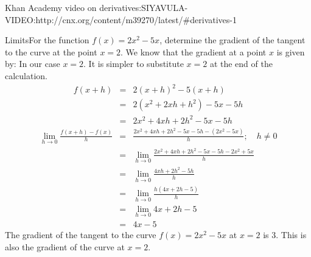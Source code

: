 Khan Academy video on derivatives:SIYAVULA-VIDEO:http://cnx.org/content/m39270/latest/#derivatives-1

\begin{wex}{Limits}{For the function $f(x)=2x^2-5x$, determine the 
gradient of the tangent to the curve 
at the point $x=2$.}{
We know that the gradient at a point $x$ is given by:
In our case $x=2$. It is simpler to substitute $x=2$ at the end of the calculation.
\begin{eqnarray*}
f(x+h)&=&2(x+h)^2-5(x+h)\\
&=&2(x^2+2xh+h^2)-5x-5h\\
&=&2x^2+4xh+2h^2-5x-5h
\end{eqnarray*}
\begin{eqnarray*}
\lim_{h \to 0}\frac{f(x+h)-f(x)}{h}&=&\frac{2x^2+4xh+2h^2-5x-5h - (2x^2-5x)}{h};\quad h\neq0\\
&=&\lim_{h \to 0}\frac{2x^2+4xh+2h^2-5x-5h - 2x^2+5x}{h}\\
&=&\lim_{h \to 0}\frac{4xh+2h^2-5h}{h}\\
&=&\lim_{h \to 0}\frac{h(4x+2h-5)}{h}\\
&=&\lim_{h \to 0}4x+2h-5\\
&=&4x-5
\end{eqnarray*}
The gradient of the tangent to the curve $f(x)=2x^2-5x$ at $x=2$ is $3$. This is also the gradient of the curve at $x=2$.
}\end{wex}

